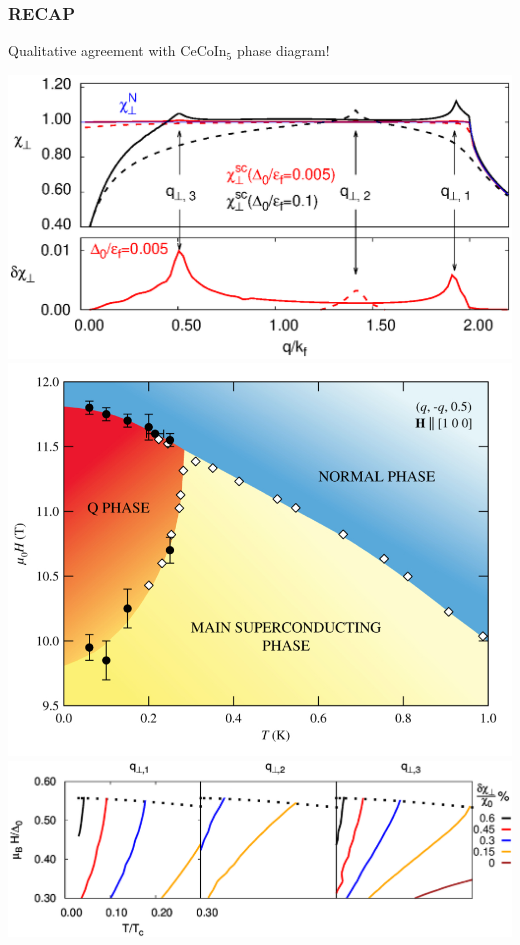 \documentclass{beamer}
\begin{document}
\begin{frame} \frametitle{RECAP}
Qualitative agreement with CeCoIn$_5$ phase diagram!
\begin{center}
		\includegraphics[scale=0.38]{Fig3.eps}
		\includegraphics[scale=0.14]{PhaseDiagramS.jpg} \\
      	\includegraphics[scale=0.38]{Fig4.eps}
\end{center}
\end{frame}
\end{document}
